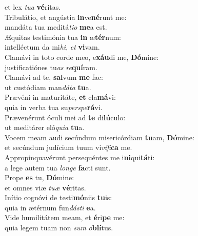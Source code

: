 \evenverse et lex \textit{tu}\textit{a} \textbf{vé}ritas.\\
\oddverse Tribulátio, et angústia \textbf{in}ve\textbf{né}runt me:~\*\\
\oddverse mandáta tua meditá\textit{ti}\textit{o} \textbf{me}a est.\\
\evenverse Æquitas testimónia tua \textbf{in} æ\textbf{tér}num:~\*\\
\evenverse intelléctum da mi\textit{hi}, \textit{et} \textbf{vi}vam.\\
\oddverse Clamávi in toto corde meo, e\textbf{xáu}di me, \textbf{Dó}mine:~\*\\
\oddverse justificatiónes tu\textit{as} \textit{re}\textbf{quí}ram.\\
\evenverse Clamávi ad te, \textbf{sal}vum \textbf{me} fac:~\*\\
\evenverse ut custódiam man\textit{dá}\textit{ta} \textbf{tu}a.\\
\oddverse Prævéni in maturitáte, \textbf{et} cla\textbf{má}vi:~\*\\
\oddverse quia in verba tua su\textit{per}\textit{spe}\textbf{rá}vi.\\
\evenverse Prævenérunt óculi mei ad \textbf{te} di\textbf{lú}culo:~\*\\
\evenverse ut meditárer eló\textit{qui}\textit{a} \textbf{tu}a.\\
\oddverse Vocem meam audi secúndum misericórdiam \textbf{tu}am, \textbf{Dó}mine:~\*\\
\oddverse et secúndum judícium tuum vi\textit{ví}\textit{fi}\textbf{ca} me.\\
\evenverse Appropinquavérunt persequéntes me i\textbf{ni}qui\textbf{tá}ti:~\*\\
\evenverse a lege autem tua \textit{lon}\textit{ge} \textbf{fa}cti sunt.\\
\oddverse Prope \textbf{es} tu, \textbf{Dó}mine:~\*\\
\oddverse et omnes viæ \textit{tu}\textit{æ} \textbf{vé}ritas.\\
\evenverse Inítio cognóvi de testi\textbf{mó}niis \textbf{tu}is:~\*\\
\evenverse quia in ætérnum fun\textit{dá}\textit{sti} \textbf{e}a.\\
\oddverse Vide humilitátem meam, et \textbf{é}ri\textbf{pe} me:~\*\\
\oddverse quia legem tuam non \textit{sum} \textit{o}\textbf{blí}tus.\\
